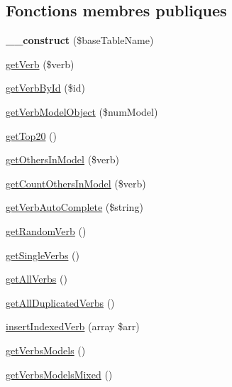 \subsection*{Fonctions membres publiques}
\begin{DoxyCompactItemize}
\item 
\hypertarget{classConjugationDataProviderBase_ad87a3d61f1cfae6a5e8e6506d1e9b57a}{}\label{classConjugationDataProviderBase_ad87a3d61f1cfae6a5e8e6506d1e9b57a} 
{\bfseries \+\_\+\+\_\+construct} (\$base\+Table\+Name)
\item 
\hyperlink{classConjugationDataProviderBase_a45ac93643d08f3099bf95faa22e9ba55}{get\+Verb} (\$verb)
\item 
\hyperlink{classConjugationDataProviderBase_a8269abd2a9be2679d2cd9f7f50ae9151}{get\+Verb\+By\+Id} (\$id)
\item 
\hyperlink{classConjugationDataProviderBase_a4be78cfcdc11584d355bdfc8b988a3ca}{get\+Verb\+Model\+Object} (\$num\+Model)
\item 
\hyperlink{classConjugationDataProviderBase_aafcbd6631477f8f634d762b5ba5dc217}{get\+Top20} ()
\item 
\hyperlink{classConjugationDataProviderBase_a964e48a9e1d9c507fdb19e96737c09e4}{get\+Others\+In\+Model} (\$verb)
\item 
\hyperlink{classConjugationDataProviderBase_a155bfe75cdc9224801c2704540205650}{get\+Count\+Others\+In\+Model} (\$verb)
\item 
\hyperlink{classConjugationDataProviderBase_a517127918e71fd89e1b7717c26353f87}{get\+Verb\+Auto\+Complete} (\$string)
\item 
\hyperlink{classConjugationDataProviderBase_aa23d566d02578adb55592bba5a796fa8}{get\+Random\+Verb} ()
\item 
\hyperlink{classConjugationDataProviderBase_a3a209dff42ff754afa7c81a8182266d7}{get\+Single\+Verbs} ()
\item 
\hyperlink{classConjugationDataProviderBase_af3d127433543eb86878447357d6382d4}{get\+All\+Verbs} ()
\item 
\hyperlink{classConjugationDataProviderBase_a645b9064803b3f6b9796fbacdb26548b}{get\+All\+Duplicated\+Verbs} ()
\item 
\hyperlink{classConjugationDataProviderBase_af619b3848a7928bc7e8f649de46e9686}{insert\+Indexed\+Verb} (array \$arr)
\item 
\hyperlink{classConjugationDataProviderBase_a12389ca76dbe2e31e08fee6b5333eed9}{get\+Verbs\+Models} ()
\item 
\hyperlink{classConjugationDataProviderBase_a779d612fb1e1d20ea7fc31511768ad66}{get\+Verbs\+Models\+Mixed} ()
\end{DoxyCompactItemize}
